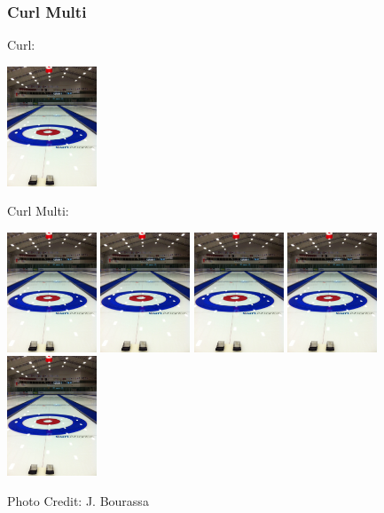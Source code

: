 \begin{frame}
	\frametitle{Curl Multi}

	Curl:
	\begin{center}
		\includegraphics[width=0.2\textwidth]{images/curling.jpg}
	\end{center}

	Curl Multi:
	\begin{center}
		\includegraphics[width=0.2\textwidth]{images/curling.jpg}
		\includegraphics[width=0.2\textwidth]{images/curling.jpg}
		\includegraphics[width=0.2\textwidth]{images/curling.jpg}
		\includegraphics[width=0.2\textwidth]{images/curling.jpg}
		\includegraphics[width=0.2\textwidth]{images/curling.jpg}
	\end{center}

	\hfill Photo Credit: J. Bourassa

\end{frame}


